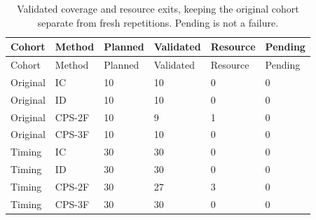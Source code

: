 \begingroup
\small
\begin{longtable}{llllll}
\caption{Validated coverage and resource exits, keeping the original cohort separate from fresh repetitions. Pending is not a failure.}\label{tab:completion}\\
\toprule
Cohort & Method & Planned & Validated & Resource & Pending \\
\midrule
\endfirsthead
\toprule
Cohort & Method & Planned & Validated & Resource & Pending \\
\midrule
\endhead
Original & IC & 10 & 10 & 0 & 0 \\
Original & ID & 10 & 10 & 0 & 0 \\
Original & CPS-2F & 10 & 9 & 1 & 0 \\
Original & CPS-3F & 10 & 10 & 0 & 0 \\
Timing & IC & 30 & 30 & 0 & 0 \\
Timing & ID & 30 & 30 & 0 & 0 \\
Timing & CPS-2F & 30 & 27 & 3 & 0 \\
Timing & CPS-3F & 30 & 30 & 0 & 0 \\
\bottomrule
\end{longtable}
\endgroup
